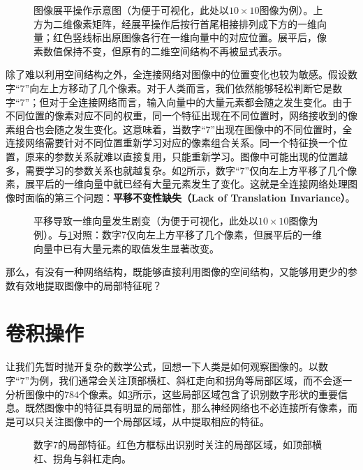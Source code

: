 \begin{figure}[H]
    \caption{图像展平操作示意图（为便于可视化，此处以$10\times10$图像为例）。上方为二维像素矩阵，经展平操作后按行首尾相接排列成下方的一维向量；红色竖线标出原图像各行在一维向量中的对应位置。展平后，像素数值保持不变，但原有的二维空间结构不再被显式表示。}
    \label{fig:flatten}
\end{figure}

除了难以利用空间结构之外，全连接网络对图像中的位置变化也较为敏感。假设数字“7”向左上方移动了几个像素。对于人类而言，我们依然能够轻松判断它是数字“7”；但对于全连接网络而言，输入向量中的大量元素都会随之发生变化。由于不同位置的像素对应不同的权重，同一个特征出现在不同位置时，网络接收到的像素组合也会随之发生变化。这意味着，当数字“7”出现在图像中的不同位置时，全连接网络需要针对不同位置重新学习对应的像素组合关系。同一个特征换一个位置，原来的参数关系就难以直接复用，只能重新学习。图像中可能出现的位置越多，需要学习的参数关系也就越复杂。如\cref{fig:translate}所示，数字“7”仅向左上方平移了几个像素，展平后的一维向量中就已经有大量元素发生了变化。这就是全连接网络处理图像时面临的第三个问题：\textbf{平移不变性缺失（Lack of Translation Invariance）}。

\begin{figure}[H]
    \caption{平移导致一维向量发生剧变（为便于可视化，此处以$10\times 10$图像为例）。与\cref{fig:flatten}对照：数字7仅向左上方平移了几个像素，但展平后的一维向量中已有大量元素的取值发生显著改变。}
    \label{fig:translate}
\end{figure}

那么，有没有一种网络结构，既能够直接利用图像的空间结构，又能够用更少的参数有效地提取图像中的局部特征呢？

\section{卷积操作}

让我们先暂时抛开复杂的数学公式，回想一下人类是如何观察图像的。以数字“7”为例，我们通常会关注顶部横杠、斜杠走向和拐角等局部区域，而不会逐一分析图像中的$784$个像素。如\cref{fig:mnist_7_local}所示，这些局部区域包含了识别数字形状的重要信息。既然图像中的特征具有明显的局部性，那么神经网络也不必连接所有像素，而是可以只关注图像中的一个局部区域，从中提取相应的特征。

\begin{figure}[H]
    \caption{数字7的局部特征。红色方框标出识别时关注的局部区域，如顶部横杠、拐角与斜杠走向。}
    \label{fig:mnist_7_local}
\end{figure}

